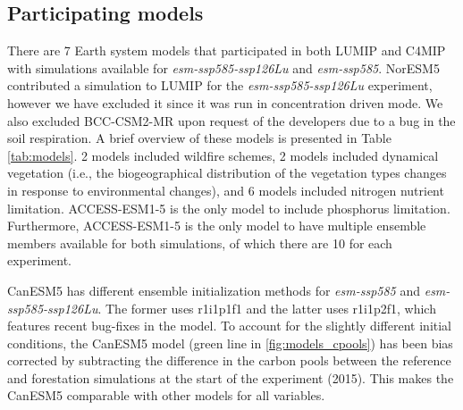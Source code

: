 \documentclass[]{article}
\begin{document}
\subsection{Participating models}

There are 7 Earth system models that participated in both LUMIP and C4MIP with simulations available for \textit{esm-ssp585-ssp126Lu} and \textit{esm-ssp585}.
NorESM5 contributed a simulation to LUMIP for the \textit{esm-ssp585-ssp126Lu} experiment, however we have excluded it since it was run in concentration driven mode.
We also excluded BCC-CSM2-MR upon request of the developers due to a bug in the soil respiration.
A brief overview of these models is presented in Table \ref{tab:models}.
2 models included wildfire schemes, 2 models included dynamical vegetation (i.e., the biogeographical distribution of the vegetation types changes in response to environmental changes), and 6 models included nitrogen nutrient limitation.
ACCESS-ESM1-5 is the only model to include phosphorus limitation.
Furthermore, ACCESS-ESM1-5 is the only model to have multiple ensemble members available for both simulations, of which there are 10 for each experiment.

CanESM5 has different ensemble initialization methods for \textit{esm-ssp585} and \textit{esm-ssp585-ssp126Lu}.
The former uses r1i1p1f1 and the latter uses r1i1p2f1, which features recent bug-fixes in the model.
To account for the slightly different initial conditions, the CanESM5 model (green line in \ref{fig:models_cpools}) has been bias corrected by subtracting the difference in the carbon pools between the reference and forestation simulations at the start of the experiment (2015).
This makes the CanESM5 comparable with other models for all variables.
\end{document}
